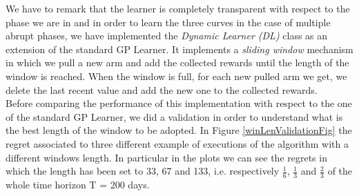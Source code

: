 We have to remark that the learner is completely transparent with respect to the phase we are in and in order to learn the three curves in the case of multiple abrupt phases, we have implemented the \textit{Dynamic Learner (DL)} class as an extension of the standard GP Learner.
It implements a \textit{sliding window} mechanism in which we pull a new arm and add the collected rewards until the length of the window is reached. When the window is full, for each new pulled arm we get, we delete the last recent value and add the new one to the collected rewards.\\ Before comparing the performance of this implementation with respect to the one of the standard GP Learner, we did a validation in order to understand what is the best length of the window to be adopted. In Figure \ref{winLenValidationFig} the regret associated to three different example of executions of the algorithm with a different windows length. In particular in the plots we can see the regrets in which the length has been set to 33, 67 and 133, i.e. respectively $\frac{1}{6}$, $\frac{1}{3}$ and $\frac{2}{3}$ of the whole time horizon T = 200 days.
